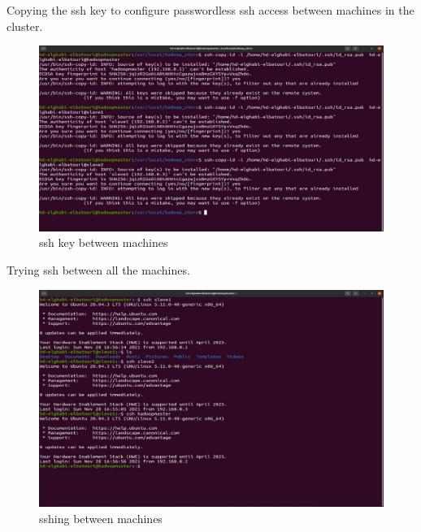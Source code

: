 \begin{spacing}{1.2}
\par Copying the ssh key to configure passwordless ssh access between machines in the cluster.
\\
\begin{figure}[!htb] 
\begin{center} 
\includegraphics[width=1\linewidth]{Big_Data/Hadoop/Multi-Nodes Cluster/ssh key between machines} 
\end{center} 
\caption{ssh key between machines} 
\end{figure} 
\FloatBarrier



\par Trying ssh between all the machines.
\\
\begin{figure}[!htb] 
\begin{center} 
\includegraphics[width=1\linewidth]{Big_Data/Hadoop/Multi-Nodes Cluster/sshing between machines} 
\end{center} 
\caption{sshing between machines} 
\end{figure} 
\FloatBarrier


\end{spacing}
